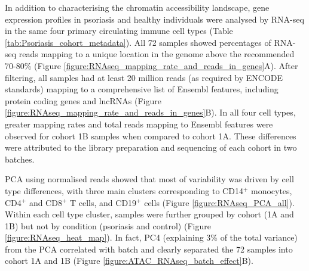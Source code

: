 In addition to characterising the chromatin accessibility landscape, gene expression profiles in psoriasis and healthy individuals were analysed  by RNA-seq in the same four primary circulating immune cell types (Table \ref{tab:Psoriasis_cohort_metadata}). All 72 samples showed percentages of RNA-seq reads mapping to a unique location in the genome above the recommended 70-80\% (Figure \ref{figure:RNAseq_mapping_rate_and_reads_in_genes}A). After filtering, all samples had at least 20 million reads (as required by ENCODE standards) mapping to a comprehensive list of Ensembl features, including protein coding genes and lncRNAs (Figure \ref{figure:RNAseq_mapping_rate_and_reads_in_genes}B). %
In all four cell types, greater mapping rates and total reads mapping to Ensembl features were observed for cohort 1B samples when compared to cohort 1A. These differences were attributed to the library preparation and sequencing of each cohort in two batches.  

PCA using normalised reads showed that most of variability was driven by cell type differences, with three main clusters corresponding to CD14$^+$ monocytes, CD4$^+$ and CD8$^+$ T cells, and CD19$^+$ cells (Figure \ref{figure:RNAseq_PCA_all}). Within each cell type cluster, samples were further grouped by cohort (1A and 1B) but not by condition (psoriasis and control) (Figure \ref{figure:RNAseq_heat_map}). In fact, PC4 (explaining 3\% of the total variance) from the PCA correlated with batch and clearly separated the 72 samples into cohort 1A and 1B (Figure \ref{figure:ATAC_RNAseq_batch_effect}B). 


